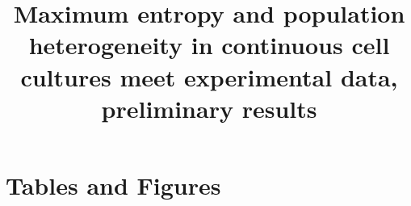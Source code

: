\documentclass[]{article}
\title{Maximum entropy and population heterogeneity in 
	continuous cell cultures meet experimental data, preliminary results}
\author{}
\begin{document}
	
	\maketitle
	
	
	
	
	
	\section{Tables and Figures}
	
		
		
		
		
	
\end{document}
